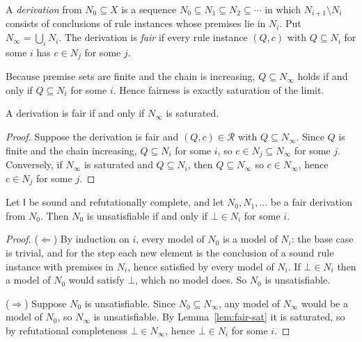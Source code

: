 \begin{definition}
\label{def:derivation}
A \emph{derivation} from $N_0\subseteq X$ is a sequence $N_0\subseteq N_1\subseteq N_2\subseteq\cdots$ in which $N_{i+1}\setminus N_i$ consists of conclusions of rule instances whose premises lie in $N_i$. Put $N_\infty=\bigcup_i N_i$. The derivation is \emph{fair} if every rule instance $(Q,c)$ with $Q\subseteq N_i$ for some $i$ has $c\in N_j$ for some $j$.
\end{definition}

Because premise sets are finite and the chain is increasing, $Q\subseteq N_\infty$ holds if and only if $Q\subseteq N_i$ for some $i$. Hence fairness is exactly saturation of the limit.

\begin{lemma}
\label{lem:fair-sat}
A derivation is fair if and only if $N_\infty$ is saturated.
\end{lemma}

\begin{proof}
Suppose the derivation is fair and $(Q,c)\in\mathcal{R}$ with $Q\subseteq N_\infty$. Since $Q$ is finite and the chain increasing, $Q\subseteq N_i$ for some $i$, so $c\in N_j\subseteq N_\infty$ for some $j$. Conversely, if $N_\infty$ is saturated and $Q\subseteq N_i$, then $Q\subseteq N_\infty$ so $c\in N_\infty$, hence $c\in N_j$ for some $j$.
\end{proof}

\begin{theorem}
\label{thm:fair}
Let $\mathsf{I}$ be sound and refutationally complete, and let $N_0,N_1,\dots$ be a fair derivation from $N_0$. Then $N_0$ is unsatisfiable if and only if $\bot\in N_i$ for some $i$.
\end{theorem}

\begin{proof}
($\Leftarrow$) By induction on $i$, every model of $N_0$ is a model of $N_i$: the base case is trivial, and for the step each new element is the conclusion of a sound rule instance with premises in $N_i$, hence satisfied by every model of $N_i$. If $\bot\in N_i$ then a model of $N_0$ would satisfy $\bot$, which no model does. So $N_0$ is unsatisfiable.

($\Rightarrow$) Suppose $N_0$ is unsatisfiable. Since $N_0\subseteq N_\infty$, any model of $N_\infty$ would be a model of $N_0$, so $N_\infty$ is unsatisfiable. By Lemma~\ref{lem:fair-sat} it is saturated, so by refutational completeness $\bot\in N_\infty$, hence $\bot\in N_i$ for some $i$.
\end{proof}


